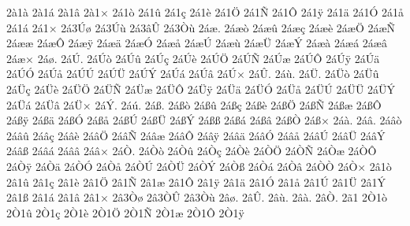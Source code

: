 {%
2^^e01^^e0
2^^e01^^e1
2^^e01^^e2
2^^e01^^d7
2^^e11^^f2
2^^e11^^fb
2^^e11^^e7
2^^e11^^e8
2^^e11^^d6
2^^e11^^d1
2^^e11^^d4
2^^e11^^ff
2^^e11^^e4
2^^e11^^d3
2^^e11^^e5
2^^e11^^e1
2^^e11^^d7
2^^e13^^da^^f8
2^^e13^^da^^f9
2^^e13^^e2^^db
2^^e13^^d2^^f9
2^^e1^^e6.
2^^e1^^e6^^f2
2^^e1^^e6^^fb
2^^e1^^e6^^e7
2^^e1^^e6^^e8
2^^e1^^e6^^d6
2^^e1^^e6^^d1
2^^e1^^e6^^e6
2^^e1^^e6^^d4
2^^e1^^e6^^ff
2^^e1^^e6^^e4
2^^e1^^e6^^d3
2^^e1^^e6^^e5
2^^e1^^e6^^da
2^^e1^^e6^^f9
2^^e1^^e6^^dc
2^^e1^^e6^^dd
2^^e1^^e6^^e0
2^^e1^^e6^^e1
2^^e1^^e6^^e2
2^^e1^^e6^^d7
2^^e1^^f8.
2^^e1^^da.
2^^e1^^da^^f2
2^^e1^^da^^fb
2^^e1^^da^^e7
2^^e1^^da^^e8
2^^e1^^da^^d6
2^^e1^^da^^d1
2^^e1^^da^^e6
2^^e1^^da^^d4
2^^e1^^da^^ff
2^^e1^^da^^e4
2^^e1^^da^^d3
2^^e1^^da^^e5
2^^e1^^da^^da
2^^e1^^da^^dc
2^^e1^^da^^dd
2^^e1^^da^^e1
2^^e1^^da^^e2
2^^e1^^da^^d7
2^^e1^^db.
2^^e1^^f9.
2^^e1^^dc.
2^^e1^^dc^^f2
2^^e1^^dc^^fb
2^^e1^^dc^^e7
2^^e1^^dc^^e8
2^^e1^^dc^^d6
2^^e1^^dc^^d1
2^^e1^^dc^^e6
2^^e1^^dc^^d4
2^^e1^^dc^^ff
2^^e1^^dc^^e4
2^^e1^^dc^^d3
2^^e1^^dc^^e5
2^^e1^^dc^^da
2^^e1^^dc^^dc
2^^e1^^dc^^dd
2^^e1^^dc^^e1
2^^e1^^dc^^e2
2^^e1^^dc^^d7
2^^e1^^dd.
2^^e1^^fa.
2^^e1^^df.
2^^e1^^df^^f2
2^^e1^^df^^fb
2^^e1^^df^^e7
2^^e1^^df^^e8
2^^e1^^df^^d6
2^^e1^^df^^d1
2^^e1^^df^^e6
2^^e1^^df^^d4
2^^e1^^df^^ff
2^^e1^^df^^e4
2^^e1^^df^^d3
2^^e1^^df^^e5
2^^e1^^df^^da
2^^e1^^df^^dc
2^^e1^^df^^dd
2^^e1^^df^^df
2^^e1^^df^^e1
2^^e1^^df^^e2
2^^e1^^df^^d2
2^^e1^^df^^d7
2^^e1^^e0.
2^^e1^^e2.
2^^e1^^e2^^f2
2^^e1^^e2^^fb
2^^e1^^e2^^e7
2^^e1^^e2^^e8
2^^e1^^e2^^d6
2^^e1^^e2^^d1
2^^e1^^e2^^e6
2^^e1^^e2^^d4
2^^e1^^e2^^ff
2^^e1^^e2^^e4
2^^e1^^e2^^d3
2^^e1^^e2^^e5
2^^e1^^e2^^da
2^^e1^^e2^^dc
2^^e1^^e2^^dd
2^^e1^^e2^^df
2^^e1^^e2^^e1
2^^e1^^e2^^e2
2^^e1^^e2^^d7
2^^e1^^d2.
2^^e1^^d2^^f2
2^^e1^^d2^^fb
2^^e1^^d2^^e7
2^^e1^^d2^^e8
2^^e1^^d2^^d6
2^^e1^^d2^^d1
2^^e1^^d2^^e6
2^^e1^^d2^^d4
2^^e1^^d2^^ff
2^^e1^^d2^^e4
2^^e1^^d2^^d3
2^^e1^^d2^^e5
2^^e1^^d2^^da
2^^e1^^d2^^dc
2^^e1^^d2^^dd
2^^e1^^d2^^df
2^^e1^^d2^^e1
2^^e1^^d2^^e2
2^^e1^^d2^^d2
2^^e1^^d2^^d7
2^^e21^^f2
2^^e21^^fb
2^^e21^^e7
2^^e21^^e8
2^^e21^^d6
2^^e21^^d1
2^^e21^^e6
2^^e21^^d4
2^^e21^^ff
2^^e21^^e4
2^^e21^^d3
2^^e21^^e5
2^^e21^^da
2^^e21^^dc
2^^e21^^dd
2^^e21^^df
2^^e21^^e1
2^^e21^^e2
2^^e21^^d7
2^^e23^^d2^^f8
2^^e23^^d2^^db
2^^e23^^d2^^f9
2^^e2^^f8.
2^^e2^^db.
2^^e2^^f9.
2^^e2^^e0.
2^^e2^^d2.
2^^e31
2^^d21^^f2
2^^d21^^fb
2^^d21^^e7
2^^d21^^e8
2^^d21^^d6
2^^d21^^d1
2^^d21^^e6
2^^d21^^d4
2^^d21^^ff
}
